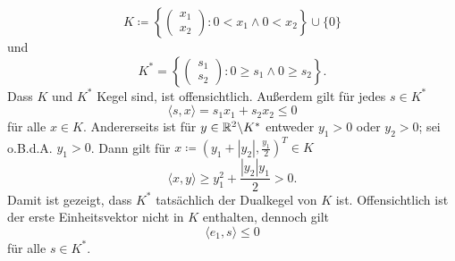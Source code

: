 \begin{compactenum}[(i)]
 \begin{displaymath}
  K\coloneqq\left\{\begin{pmatrix}x_1\\x_2\end{pmatrix}: 0< x_1 \land 0< x_2 \right\}\cup\{0\}
 \end{displaymath}
  und
  \begin{displaymath}
  K^*=\left\{\begin{pmatrix}s_1\\s_2\end{pmatrix}: 0\geq s_1 \land 0\geq s_2 \right\}.
 \end{displaymath}
 Dass $K$ und $K^*$ Kegel sind, ist offensichtlich. Außerdem gilt für jedes $s\in K^*$
 \begin{displaymath}
  \langle s,x\rangle =s_1x_1+s_2x_2\leq 0
 \end{displaymath}
 für alle $x\in K$. Andererseits ist für $y\in \mathbb{R}^2\backslash K^*$ entweder $y_1>0$ oder $y_2>0$;
 sei o.B.d.A. $y_1>0$. Dann gilt für $x\coloneqq(y_1+|y_2|,\frac{y_1}{2})^T\in K$
 \begin{displaymath}
  \langle x, y\rangle \geq y_1^2+\frac{|y_2|y_1}{2}>0.
 \end{displaymath}
 Damit ist gezeigt, dass $K^*$ tatsächlich der Dualkegel von $K$ ist. Offensichtlich ist der 
 erste Einheitsvektor nicht in $K$ enthalten, dennoch gilt
  \begin{displaymath}
  \langle e_1, s\rangle \leq 0
 \end{displaymath}
 für alle $s\in K^*$.
\end{compactenum}
